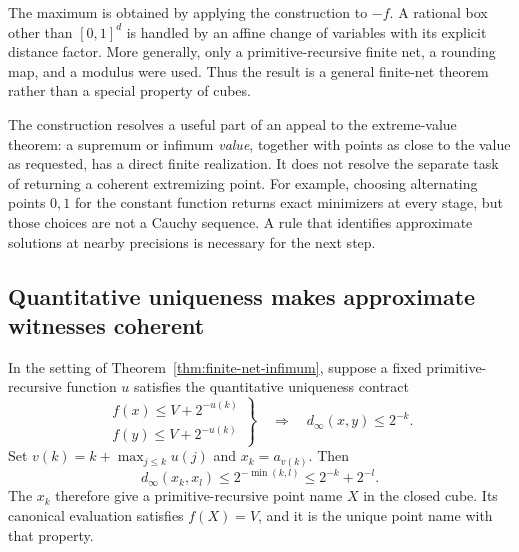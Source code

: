 The maximum is obtained by applying the construction to $-f$.  A
rational box other than $[0,1]^d$ is handled by an affine change of
variables with its explicit distance factor.  More generally, only a
primitive-recursive finite net, a rounding map, and a modulus were used.
Thus the result is a general finite-net theorem rather than a special
property of cubes.

The construction resolves a useful part of an appeal to the extreme-value
theorem: a supremum or infimum \emph{value}, together with points as close
to the value as requested, has a direct finite realization.  It does not
resolve the separate task of returning a coherent extremizing point.
For example, choosing alternating points $0,1$ for the constant function
returns exact minimizers at every stage, but those choices are not a
Cauchy sequence.  A rule that identifies approximate solutions at nearby
precisions is necessary for the next step.

\subsection{Quantitative uniqueness makes approximate witnesses coherent}

\begin{theorem}
\label{thm:coherent-minimizer}
In the setting of Theorem~\ref{thm:finite-net-infimum}, suppose a fixed
primitive-recursive function $u$ satisfies the quantitative uniqueness
contract
\begin{equation}
 \left.
 \begin{array}{c}
 f(x)\le V+2^{-u(k)}\\
 f(y)\le V+2^{-u(k)}
 \end{array}\right\}
 \quad\Longrightarrow\quad d_\infty(x,y)\le2^{-k}.
 \label{eq:quantitative-uniqueness}
\end{equation}
Set $v(k)=k+\max_{j\le k}u(j)$ and $x_k=a_{v(k)}$.
Then
\[
 d_\infty(x_k,x_l)\le2^{-\min(k,l)}
                    \le2^{-k}+2^{-l}.
\]
The $x_k$ therefore give a primitive-recursive point name $X$ in the
closed cube.  Its canonical evaluation satisfies $f(X)=V$, and it is
the unique point name with that property.
\end{theorem}

